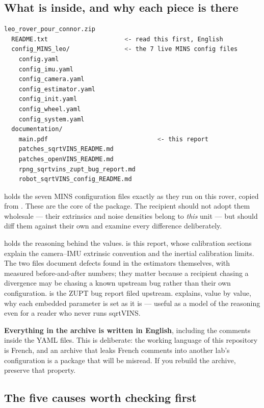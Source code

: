 \subsection{What is inside, and why each piece is there}

\begin{lstlisting}[language=bash]
leo_rover_pour_connor.zip
  README.txt                     <- read this first, English
  config_MINS_leo/               <- the 7 live MINS config files
    config.yaml
    config_imu.yaml
    config_camera.yaml
    config_estimator.yaml
    config_init.yaml
    config_wheel.yaml
    config_system.yaml
  documentation/
    main.pdf                              <- this report
    patches_sqrtVINS_README.md
    patches_openVINS_README.md
    rpng_sqrtvins_zupt_bug_report.md
    robot_sqrtVINS_config_README.md
\end{lstlisting}

\noindent \textbf{} holds the seven MINS configuration
files exactly as they run on this rover, copied from
. These are the
core of the package. The recipient should not adopt them wholesale --- their
extrinsics and noise densities belong to \emph{this} unit --- but should diff
them against their own and examine every difference deliberately.

\noindent \textbf{} holds the reasoning behind the values.
 is this report, whose calibration sections explain the
camera--IMU extrinsic convention and the inertial calibration limits. The two
 files document defects found in the estimators themselves,
with measured before-and-after numbers; they matter because a recipient chasing
a divergence may be chasing a known upstream bug rather than their own
configuration.  is the ZUPT bug
report filed upstream.  explains, value
by value, why each embedded parameter is set as it is --- useful as a model of
the reasoning even for a reader who never runs sqrtVINS.

\noindent \textbf{Everything in the archive is written in English}, including
the comments inside the YAML files. This is deliberate: the working language of
this repository is French, and an archive that leaks French comments into
another lab's configuration is a package that will be misread. If you rebuild
the archive, preserve that property.

\subsection{The five causes worth checking first}

